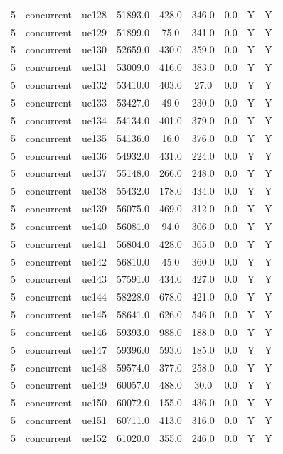 \begin{table}[ht]
\begin{tabular}{|c|c|c|c|c|c|c|c|c|}
5 & concurrent & ue128 & 51893.0 & 428.0 & 346.0 & 0.0 & Y & Y \\
5 & concurrent & ue129 & 51899.0 & 75.0 & 341.0 & 0.0 & Y & Y \\
5 & concurrent & ue130 & 52659.0 & 430.0 & 359.0 & 0.0 & Y & Y \\
5 & concurrent & ue131 & 53009.0 & 416.0 & 383.0 & 0.0 & Y & Y \\
5 & concurrent & ue132 & 53410.0 & 403.0 & 27.0 & 0.0 & Y & Y \\
5 & concurrent & ue133 & 53427.0 & 49.0 & 230.0 & 0.0 & Y & Y \\
5 & concurrent & ue134 & 54134.0 & 401.0 & 379.0 & 0.0 & Y & Y \\
5 & concurrent & ue135 & 54136.0 & 16.0 & 376.0 & 0.0 & Y & Y \\
5 & concurrent & ue136 & 54932.0 & 431.0 & 224.0 & 0.0 & Y & Y \\
5 & concurrent & ue137 & 55148.0 & 266.0 & 248.0 & 0.0 & Y & Y \\
5 & concurrent & ue138 & 55432.0 & 178.0 & 434.0 & 0.0 & Y & Y \\
5 & concurrent & ue139 & 56075.0 & 469.0 & 312.0 & 0.0 & Y & Y \\
5 & concurrent & ue140 & 56081.0 & 94.0 & 306.0 & 0.0 & Y & Y \\
5 & concurrent & ue141 & 56804.0 & 428.0 & 365.0 & 0.0 & Y & Y \\
5 & concurrent & ue142 & 56810.0 & 45.0 & 360.0 & 0.0 & Y & Y \\
5 & concurrent & ue143 & 57591.0 & 434.0 & 427.0 & 0.0 & Y & Y \\
5 & concurrent & ue144 & 58228.0 & 678.0 & 421.0 & 0.0 & Y & Y \\
5 & concurrent & ue145 & 58641.0 & 626.0 & 546.0 & 0.0 & Y & Y \\
5 & concurrent & ue146 & 59393.0 & 988.0 & 188.0 & 0.0 & Y & Y \\
5 & concurrent & ue147 & 59396.0 & 593.0 & 185.0 & 0.0 & Y & Y \\
5 & concurrent & ue148 & 59574.0 & 377.0 & 258.0 & 0.0 & Y & Y \\
5 & concurrent & ue149 & 60057.0 & 488.0 & 30.0 & 0.0 & Y & Y \\
5 & concurrent & ue150 & 60072.0 & 155.0 & 436.0 & 0.0 & Y & Y \\
5 & concurrent & ue151 & 60711.0 & 413.0 & 316.0 & 0.0 & Y & Y \\
5 & concurrent & ue152 & 61020.0 & 355.0 & 246.0 & 0.0 & Y & Y \\

\end{tabular}
\end{table}
